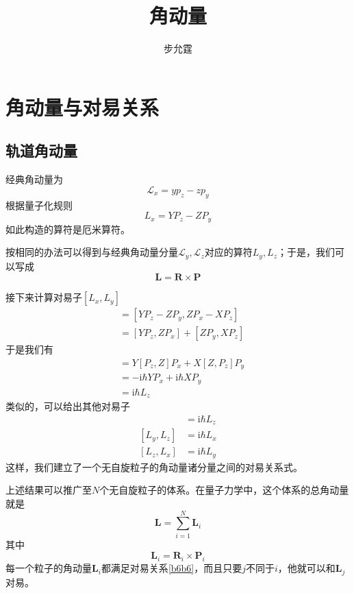 \documentclass[]{article}
\title{角动量}
\author{步允霆}
\begin{document}
	
	\maketitle
	\tableofcontents
\section{角动量与对易关系}
\subsection{轨道角动量}
经典角动量为
\begin{equation}
	\mathscr{L}_x=yp_z-zp_y
\end{equation}
根据量子化规则
\begin{equation}
	L_x=YP_z-ZP_y
\end{equation}
如此构造的算符是厄米算符。\par 
按相同的办法可以得到与经典角动量分量$\mathscr{L}_y,\mathscr{L}_z$对应的算符$L_y,L_z$；于是，我们可以写成
\begin{equation}
	\mathbf{L}=\mathbf{R}\times\mathbf{P}
\end{equation}

接下来计算对易子$[L_x,L_y]$
\begin{align}
	[L_x,L_y]&=[YP_z-ZP_y,ZP_x-XP_z]\nonumber\\
	&=[YP_z,ZP_x]+[ZP_y,XP_z]
\end{align}
于是我们有
\begin{align}
	[L_z,L_y]&=Y[P_z,Z]P_x+X[Z,P_z]P_y\nonumber\\
	&=-\mathrm{i}\hbar YP_x+\mathrm{i}\hbar XP_y\nonumber\\
	&=\mathrm{i}\hbar L_z
\end{align}
类似的，可以给出其他对易子
\begin{align}
	[L_x,L_y]&=\mathrm{i}\hbar L_z\nonumber\\
	[L_y,L_z]&=\mathrm{i}\hbar L_x\nonumber\\
	[L_z,L_x]&=\mathrm{i}\hbar L_y
	\label{b6b6}
\end{align}
这样，我们建立了一个无自旋粒子的角动量诸分量之间的对易关系式。\par 
上述结果可以推广至$N$个无自旋粒子的体系。在量子力学中，这个体系的总角动量就是
\begin{equation}
	\mathbf{L}=\sum\limits_{i=1}^{N}\mathbf{L}_i
\end{equation}
其中
\begin{equation}
	\mathbf{L}_i=\mathbf{R}_i\times\mathbf{P}_i
\end{equation}
每一个粒子的角动量$\mathbf{L}_i$都满足对易关系\eqref{b6b6}，而且只要$j$不同于$i$，他就可以和$\mathbf{L}_j$对易。
\end{document}
